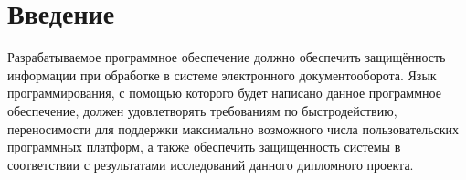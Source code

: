 \section{Введение} \label{technologic_introduction}


Разрабатываемое программное обеспечение должно обеспечить защищённость информации при обработке в системе электронного документооборота. Язык программирования, с помощью которого будет написано данное программное обеспечение, должен удовлетворять требованиям по быстродействию, переносимости для поддержки максимально возможного числа пользовательских программных платформ, а также обеспечить защищенность системы в соответствии с результатами исследований данного дипломного проекта.